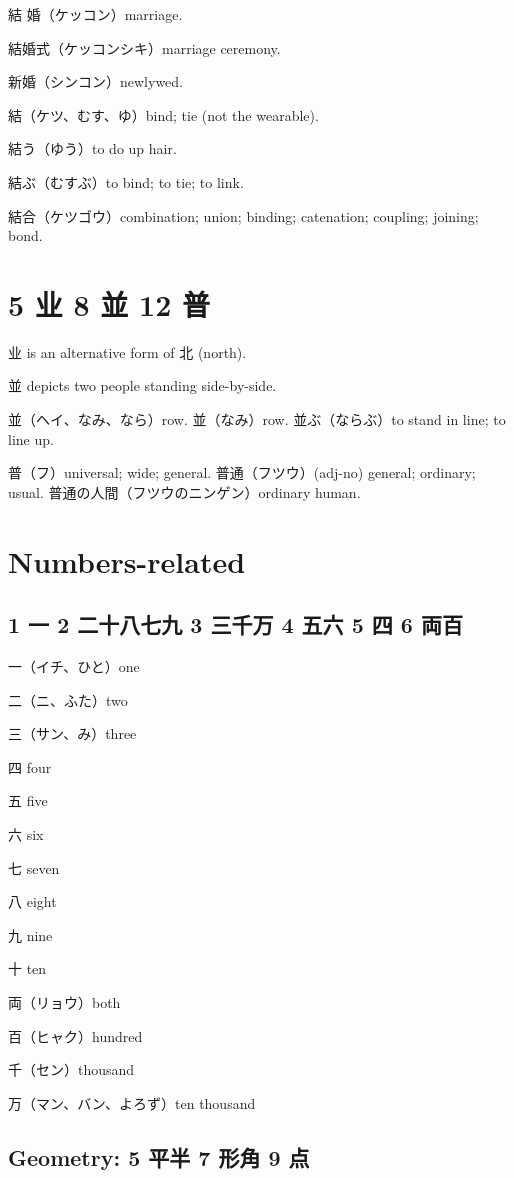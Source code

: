 結 婚（ケッコン）marriage.

結婚式（ケッコンシキ）marriage ceremony.

新婚（シンコン）newlywed.

結（ケツ、むす、ゆ）bind; tie (not the wearable).

結う（ゆう）to do up hair.

結ぶ（むすぶ）to bind; to tie; to link.

結合（ケツゴウ）combination; union; binding; catenation; coupling; joining; bond.

\section{5 业 8 並 12 普}

业 is an alternative form of 北 (north).

並 depicts two people standing side-by-side.

並（ヘイ、なみ、なら）row.
並（なみ）row.
並ぶ（ならぶ）to stand in line; to line up.

普（フ）universal; wide; general.
普通（フツウ）(adj-no) general; ordinary; usual.
普通の人間（フツウのニンゲン）ordinary human.

\section{Numbers-related}

\subsection{1 一 2 二十八七九 3 三千万 4 五六 5 四 6 両百}

一（イチ、ひと）one

二（ニ、ふた）two

三（サン、み）three

四 four

五 five

六 six

七 seven

八 eight

九 nine

十 ten

両（リョウ）both

百（ヒャク）hundred

千（セン）thousand

万（マン、バン、よろず）ten thousand

\subsection{Geometry: 5 平半 7 形角 9 点}

